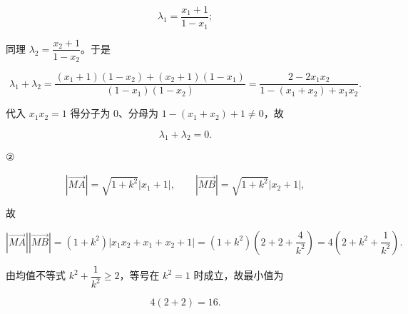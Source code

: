 \begin{answer}
\nopagebreak[4]
\[\lambda_1=\frac{x_1+1}{1-x_1};\]

同理 $\lambda_2=\dfrac{x_2+1}{1-x_2}$。于是

\nopagebreak[4]
\[\lambda_1+\lambda_2=\frac{(x_1+1)(1-x_2)+(x_2+1)(1-x_1)}{(1-x_1)(1-x_2)}
=\frac{2-2x_1x_2}{1-(x_1+x_2)+x_1x_2}.\]

代入 $x_1x_2=1$ 得分子为 $0$、分母为 $1-(x_1+x_2)+1\neq0$，故

\nopagebreak[4]
\[\lambda_1+\lambda_2=0.\]

②

\nopagebreak[4]
\[\left|\overrightarrow{MA}\right|=\sqrt{1+k^2}\left|x_1+1\right|,\qquad
\left|\overrightarrow{MB}\right|=\sqrt{1+k^2}\left|x_2+1\right|,\]

故

\nopagebreak[4]
\[\left|\overrightarrow{MA}\right|\left|\overrightarrow{MB}\right|=(1+k^2)\left|x_1x_2+x_1+x_2+1\right|
=(1+k^2)\left(2+2+\frac4{k^2}\right)
=4\left(2+k^2+\frac1{k^2}\right).\]

由均值不等式 $k^2+\dfrac1{k^2}\geqslant2$，等号在 $k^2=1$ 时成立，故最小值为

\nopagebreak[4]
\[4(2+2)=16.\]


\end{answer}